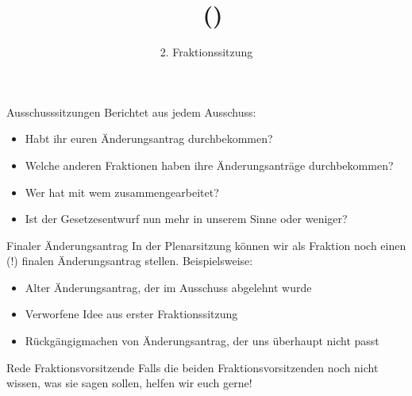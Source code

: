 \documentclass{beamer}
\title{\Fraktionsname\ (\Fraktionskuerzel)}
\subtitle{2. Fraktionssitzung}
\date{\datum}
\begin{document}
\frame{\titlepage}

\begin{frame}{Ausschusssitzungen} %
\vspace{-1.5cm}
Berichtet aus jedem Ausschuss:
\newline
\begin{itemize}
    \item Habt ihr euren Änderungsantrag durchbekommen?
    \item Welche anderen Fraktionen haben ihre Änderungsanträge durchbekommen?
    \item Wer hat mit wem zusammengearbeitet?
    \item Ist der Gesetzesentwurf nun mehr in unserem Sinne oder weniger?
\end{itemize}
\end{frame}

\begin{frame}{Finaler Änderungsantrag} %
\vspace{-0.5cm}
In der Plenarsitzung können wir als Fraktion noch einen (!) finalen Änderungsantrag stellen. Beispielsweise: \newline
\begin{itemize}
    \item Alter Änderungsantrag, der im Ausschuss abgelehnt wurde
    \item Verworfene Idee aus erster Fraktionssitzung
    \item Rückgängigmachen von Änderungsantrag, der uns überhaupt nicht passt
\end{itemize}
\end{frame}

\begin{frame}{Rede Fraktionsvorsitzende}
\vspace{-1.5cm}
Falls die beiden Fraktionsvorsitzenden noch nicht wissen, was sie sagen sollen, helfen wir euch gerne!
\end{frame}
\end{document}
